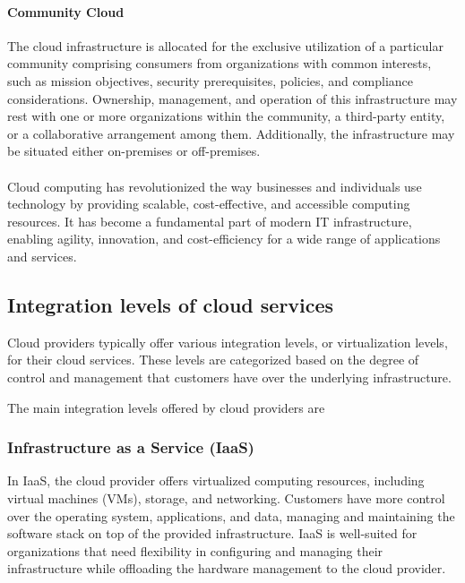 \paragraph{Community Cloud}
The cloud infrastructure is allocated for the exclusive utilization of a 
particular community comprising consumers from organizations with common interests, 
such as mission objectives, security prerequisites, policies, and compliance considerations. 
Ownership, management, and operation of this infrastructure may 
rest with one or more organizations within the community, 
a third-party entity, or a collaborative arrangement among them. 
Additionally, the infrastructure may be situated either on-premises or off-premises.
\\
\\
Cloud computing has revolutionized the way businesses and individuals use 
technology by providing scalable, cost-effective, and accessible computing resources. 
It has become a fundamental part of modern IT infrastructure, enabling agility, innovation, 
and cost-efficiency for a wide range of applications and services.

\subsection{Integration levels of cloud services}

Cloud providers typically offer various integration levels, or virtualization levels, for their cloud services. 
These levels are categorized based on the degree of control and management that customers have over the underlying infrastructure. 

The main integration levels offered by cloud providers are \cite{mellNISTDefinitionCloud} \cite{hongOverviewMulticloudComputing2019} \cite{patelCloudComputingDeployment2021} \:

\subsubsection{Infrastructure as a Service (IaaS)}
In IaaS, the cloud provider offers virtualized computing resources, including virtual machines (VMs), storage, and networking.
Customers have more control over the operating system, applications, and data, managing and maintaining the software stack on top of the provided infrastructure.
IaaS is well-suited for organizations that need flexibility in configuring and managing their infrastructure while offloading the hardware management to the cloud provider.

